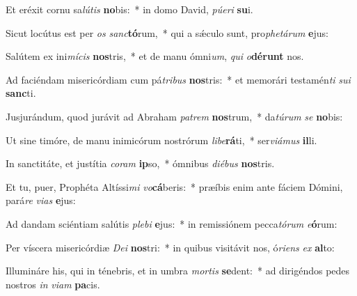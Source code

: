 \item Et eréxit cornu sa\textit{lú}\textit{tis} \textbf{no}bis:~* in domo David, \textit{pú}\textit{e}\textit{ri} \textbf{su}i.
\item Sicut locútus est per \textit{os} \textit{sanc}\textbf{tó}rum,~* qui a sǽculo sunt, pro\textit{phe}\textit{tá}\textit{rum} \textbf{e}jus:
\item Salútem ex ini\textit{mí}\textit{cis} \textbf{nos}tris,~* et de manu ómni\textit{um}, \textit{qui} \textit{o}\textbf{dé}\textbf{runt} nos.
\item Ad faciéndam misericórdiam cum pá\textit{tri}\textit{bus} \textbf{nos}tris:~* et memorári testamén\textit{ti} \textit{su}\textit{i} \textbf{sanc}ti.
\item Jusjurándum, quod jurávit ad Abraham \textit{pa}\textit{trem} \textbf{nos}trum,~* da\textit{tú}\textit{rum} \textit{se} \textbf{no}bis:
\item Ut sine timóre, de manu inimicórum nostrórum \textit{li}\textit{be}\textbf{rá}ti,~* ser\textit{vi}\textit{á}\textit{mus} \textbf{il}li.
\item In sanctitáte, et justítia \textit{co}\textit{ram} \textbf{ip}so,~* ómnibus \textit{di}\textit{é}\textit{bus} \textbf{nos}tris.
\item Et tu, puer, Prophéta Altíssi\textit{mi} \textit{vo}\textbf{cá}beris:~* præíbis enim ante fáciem Dómini, pará\textit{re} \textit{vi}\textit{as} \textbf{e}jus:
\item Ad dandam sciéntiam salútis \textit{ple}\textit{bi} \textbf{e}jus:~* in remissiónem pecca\textit{tó}\textit{rum} \textit{e}\textbf{ó}rum:
\item Per víscera misericórdiæ \textit{De}\textit{i} \textbf{nos}tri:~* in quibus visitávit nos, ó\textit{ri}\textit{ens} \textit{ex} \textbf{al}to:
\item Illumináre his, qui in ténebris, et in umbra \textit{mor}\textit{tis} \textbf{se}dent:~* ad dirigéndos pedes nostros \textit{in} \textit{vi}\textit{am} \textbf{pa}cis.
